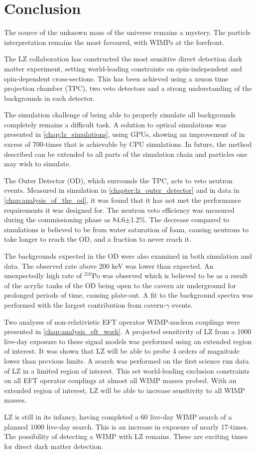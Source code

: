 \chapter{Conclusion}
\label{chap:conclusion}
\par
The source of the unknown mass of the universe remains a mystery.
The particle interpretation remains the most favoured, with WIMPs at the forefront.
\par
The LZ collaboration has constructed the most sensitive direct detection dark matter experiment, setting world-leading constraints on spin-independent and spin-dependent cross-sections.
This has been achieved using a xenon time projection chamber (TPC), two veto detectors and a strong understanding of the backgrounds in each detector.

\par
The simulation challenge of being able to properly simulate all backgrounds completely remains a difficult task.
A solution to optical simulations was presented in \autoref{chap:lz_simulations}, using GPUs, showing an improvement of in excess of 700-times that is achievable by CPU simulations.
In future, the method described can be extended to all parts of the simulation chain and particles one may wish to simulate.

\par
The Outer Detector (OD), which surrounds the TPC, acts to veto neutron events.
Measured in simulation in \autoref{chapter:lz_outer_detector} and in data in \autoref{chap:analysis_of_the_od}, it was found that it has not met the performance requirements it was designed for.
The neutron veto efficiency was measured during the commissioning phase as 84.6$\pm$1.2\%.
The decrease compared to simulations is believed to be from water saturation of foam, causing neutrons to take longer to reach the OD, and a fraction to never reach it.
\par
The backgrounds expected in the OD were also examined in both simulation and data.
The observed rate above 200 keV was lower than expected.
An unexpectedly high rate of ${}^{210}$Po was observed which is believed to be as a result of the acrylic tanks of the OD being open to the cavern air underground for prolonged periods of time, causing plate-out.
A fit to the background spectra was performed with the largest contribution from cavern-$\gamma$ events.

\par
Two analyses of non-relativistic EFT operator WIMP-nucleon couplings were presented in \autoref{chap:analysis_eft_work}.
A projected sensitivity of LZ from a 1000 live-day exposure to these signal models was performed using an extended region of interest.
It was shown that LZ will be able to probe 4 orders of magnitude lower than previous limits.
A search was performed on the first science run data of LZ in a limited region of interest.
This set world-leading exclusion constraints on all EFT operator couplings at almost all WIMP masses probed.
With an extended region of interest, LZ will be able to increase sensitivity to all WIMP masses.

\par
LZ is still in its infancy, having completed a 60 live-day WIMP search of a planned 1000 live-day search.
This is an increase in exposure of nearly 17-times.
The possibility of detecting a WIMP with LZ remains.
These are exciting times for direct dark matter detection.
